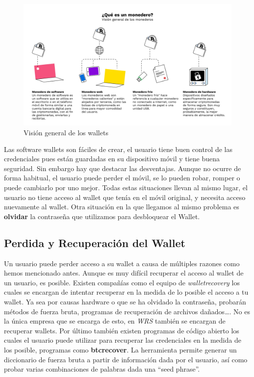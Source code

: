 \begin{figure}[h!]
  \centering
  \includegraphics[width=0.8\linewidth]{figs/Desarrollo/Wallet/que_es_wallet}
  \caption[Visión general de los wallets]{Visión general de los wallets}
  \label{fig:tipos_wallet}
\end{figure}

Las software wallets son fáciles de crear, el usuario tiene buen control de las credenciales pues están guardadas en su dispositivo móvil y tiene buena seguridad. Sin embargo hay que destacar las desventajas. Aunque no ocurre de forma habitual, el usuario puede perder el móvil, se lo pueden robar, romper o puede cambiarlo por uno mejor. Todas estas situaciones llevan al mismo lugar, el usuario no tiene acceso al wallet que tenía en el móvil original, y necesita acceso nuevamente al wallet. Otra situación en la que llegamos al mismo problema es \textbf{olvidar} la contraseña que utilizamos para desbloquear el Wallet. \\

\subsection{Perdida y Recuperación del Wallet}

Un usuario puede perder acceso a su wallet a causa de múltiples razones como hemos mencionado antes. Aunque es muy difícil recuperar el acceso al wallet de un usuario, es posible. Existen compañías como el equipo de \emph{walletrecovery}\cite{walletRec} los cuales se encargan de intentar recuperar en la medida de lo posible el acceso a tu wallet. Ya sea por causas hardware o que se ha olvidado la contraseña, probarán métodos de fuerza bruta, programas de recuperación de archivos dañados\dots. No es la única empresa que se encarga de esto, en \emph{WRS}\cite{WRS} también se encargan de recuperar wallets. Por último también existen programas de código abierto los cuales el usuario puede utilizar para recuperar las credenciales en la medida de los posible, programas como \textbf{btcrecover}\cite{btcrecover}. La herramienta permite generar un diccionario de fuerza bruta a partir de información dada por el usuario, así como probar varias combinaciones de palabras dada una ``seed phrase''. \\

